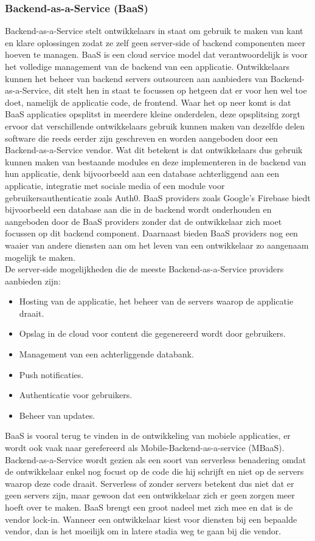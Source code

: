 \subsubsection{Backend-as-a-Service (BaaS)}
Backend-as-a-Service stelt ontwikkelaars in staat om gebruik te maken van kant en klare oplossingen zodat ze zelf geen server-side of backend componenten meer hoeven te managen. BaaS is een cloud service model dat verantwoordelijk is voor het volledige management van  de backend van een applicatie. Ontwikkelaars kunnen het beheer van backend servers outsourcen aan aanbieders van Backend-as-a-Service, dit stelt hen in staat te focussen op hetgeen dat er voor hen wel toe doet, namelijk de applicatie code, de frontend. Waar het op neer komt is dat BaaS applicaties opsplitst in meerdere kleine onderdelen, deze opsplitsing zorgt ervoor dat verschillende ontwikkelaars gebruik kunnen maken van dezelfde delen software die reeds eerder zijn geschreven en worden aangeboden door een Backend-as-a-Service vendor. Wat dit betekent is dat ontwikkelaars dus gebruik kunnen maken van bestaande modules en deze implementeren in de backend van hun applicatie, denk bijvoorbeeld aan een database achterliggend aan een applicatie, integratie met sociale media of een module voor gebruikersauthenticatie zoals Auth0. BaaS providers zoals Google's Firebase biedt bijvoorbeeld een database aan die in de backend wordt onderhouden en aangeboden door de BaaS providers zonder dat de ontwikkelaar zich moet focussen op dit backend component. Daarnaast bieden BaaS providers nog een waaier van andere diensten aan om het leven van een ontwikkelaar zo aangenaam mogelijk te maken.
\\
De server-side mogelijkheden die de meeste Backend-as-a-Service providers aanbieden zijn:
\begin{itemize}
    \item Hosting van de applicatie, het beheer van de servers waarop de applicatie draait.
    \item Opslag in de cloud voor content die gegenereerd wordt door gebruikers.
    \item Management van een achterliggende databank.
    \item Push notificaties.
    \item Authenticatie voor gebruikers.
    \item Beheer van updates.
\end{itemize}
BaaS is vooral terug te vinden in de ontwikkeling van mobiele applicaties, er wordt ook vaak naar gerefereerd als Mobile-Backend-as-a-service (MBaaS). Backend-as-a-Service wordt gezien als een soort van serverless benadering omdat de ontwikkelaar enkel nog focust op de code die hij schrijft en niet op de servers waarop deze code draait. Serverless of zonder servers betekent dus niet dat er geen servers zijn, maar gewoon dat een ontwikkelaar zich er geen zorgen meer hoeft over te maken. BaaS brengt een groot nadeel met zich mee en dat is de vendor lock-in. Wanneer een ontwikkelaar kiest voor diensten bij een bepaalde vendor, dan is het moeilijk om in latere stadia weg te gaan bij die vendor.\autocite{Cloudflare2019} 


